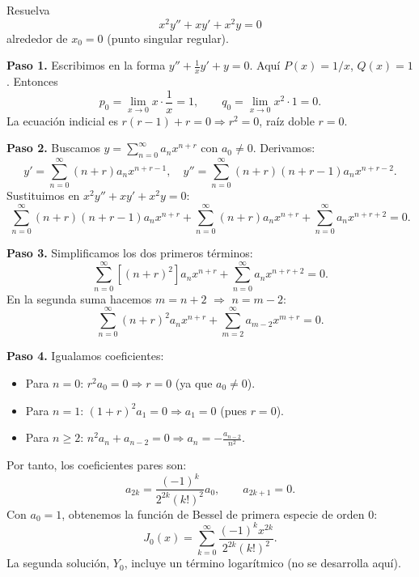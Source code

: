 \begin{example}
  Resuelva
  \[
    x^2 y'' + x y' + x^2 y = 0
  \]
  alrededor de $x_0=0$ (punto singular regular).
  \begin{myproof}
    \textbf{Paso 1.} Escribimos en la forma $y''+\frac{1}{x}y' + y=0$. Aquí $P(x)=1/x$, $Q(x)=1$. Entonces
    \[
      p_0 = \lim_{x\to0} x\cdot \frac{1}{x}=1,\qquad q_0=\lim_{x\to0} x^2\cdot 1 = 0.
    \]
    La ecuación indicial es $r(r-1)+r=0 \Rightarrow r^2=0$, raíz doble $r=0$.
    
    \textbf{Paso 2.} Buscamos $y=\sum_{n=0}^{\infty} a_n x^{n+r}$ con $a_0\neq 0$. Derivamos:
    \[
      y' = \sum_{n=0}^{\infty} (n+r)a_n x^{n+r-1},\quad
      y'' = \sum_{n=0}^{\infty} (n+r)(n+r-1)a_n x^{n+r-2}.
    \]
    Sustituimos en $x^2 y''+x y'+x^2 y=0$:
    \[
      \sum_{n=0}^{\infty} (n+r)(n+r-1)a_n x^{n+r}
      + \sum_{n=0}^{\infty} (n+r)a_n x^{n+r}
      + \sum_{n=0}^{\infty} a_n x^{n+r+2} = 0.
    \]
    
    \textbf{Paso 3.} Simplificamos los dos primeros términos:
    \[
      \sum_{n=0}^{\infty} [(n+r)^2] a_n x^{n+r}
      + \sum_{n=0}^{\infty} a_n x^{n+r+2} = 0.
    \]
    En la segunda suma hacemos $m=n+2$ $\Rightarrow$ $n=m-2$:
    \[
      \sum_{n=0}^{\infty} (n+r)^2 a_n x^{n+r}
      + \sum_{m=2}^{\infty} a_{m-2} x^{m+r} = 0.
    \]
    
    \textbf{Paso 4.} Igualamos coeficientes:
    \begin{itemize}
      \item Para $n=0$: $r^2 a_0 = 0 \Rightarrow r=0$ (ya que $a_0\neq0$).
      \item Para $n=1$: $(1+r)^2 a_1 = 0 \Rightarrow a_1=0$ (pues $r=0$).
      \item Para $n\ge 2$: $n^2 a_n + a_{n-2}=0 \Rightarrow a_n = -\frac{a_{n-2}}{n^2}$.
    \end{itemize}
    Por tanto, los coeficientes pares son:
    \[
      a_{2k} = \frac{(-1)^k}{2^{2k}(k!)^2} a_0,\qquad a_{2k+1}=0.
    \]
    Con $a_0=1$, obtenemos la función de Bessel de primera especie de orden 0:
    \[
      \boxed{
        J_0(x)=\sum_{k=0}^{\infty} \frac{(-1)^k x^{2k}}{2^{2k}(k!)^2}
      }.
    \]
    La segunda solución, $Y_0$, incluye un término logarítmico (no se desarrolla aquí).
  \end{myproof}
\end{example}

